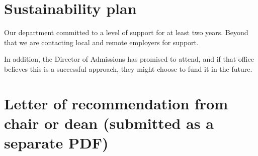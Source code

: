 \documentclass[]{article}
\begin{document}
	\section{Sustainability plan}
	Our department committed to a level of support for at least two years.
	Beyond that we are contacting local and remote employers for support.
	
	
	In addition, the Director of Admissions has promised to attend, and if that  office believes this is a successful approach, they might choose to fund it in the future.
	
 
	
	\section{Letter of recommendation from chair or dean (submitted as a separate PDF)}
\end{document}
